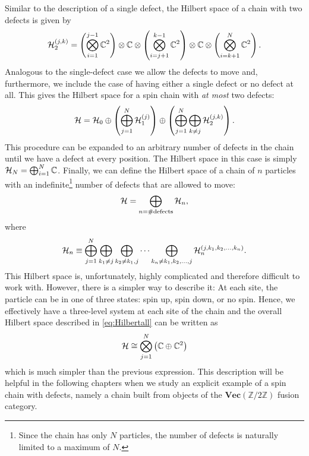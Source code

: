 Similar to the description of a single defect, the Hilbert space of a chain with two defects is given by
	\begin{equation}
		{\mathcal{H}}_2^{(j,k)}=\left(\bigotimes_{i=1}^{j-1}\mathbb{C}^2\right)\otimes\mathbb{C}\otimes\left(\bigotimes_{i=j+1}^{k-1}\mathbb{C}^2\right)\otimes\mathbb{C}\otimes\left(\bigotimes_{i=k+1}^{N}\mathbb{C}^2\right).
	\end{equation}
Analogous to the single-defect case we allow the defects to move and, furthermore, we include the case of having either a single defect or no defect at all. This gives the Hilbert space for a spin chain with \emph{at most} two defects:
	\begin{equation}
		{\mathcal{H}}={\mathcal{H}}_0\oplus\left(\bigoplus_{j=1}^N{\mathcal{H}}_1^{(j)}\right)\oplus\left(\bigoplus_{j=1}^N\bigoplus_{k\neq j}{\mathcal{H}}_2^{(j,k)}\right).
	\end{equation}
This procedure can be expanded to an arbitrary number of defects in the chain until we have a defect at every position. The Hilbert space in this case is simply ${\mathcal{H}}_N=\bigoplus_{i=1}^N\mathbb{C}$. Finally, we can define the Hilbert space of a chain of $n$ particles with an indefinite\footnote{Since the chain has only $N$ particles, the number of defects is naturally limited to a maximum of $N$.} number of defects that are allowed to move: 
	\begin{equation}
	\label{eq:Hilbertall}
		{\mathcal{H}}=\bigoplus_{n=\#\mathrm{ defects}}{\mathcal{H}}_n,
	\end{equation}
where 
	\begin{equation}
		{\mathcal{H}}_n\equiv\bigoplus_{j=1}^N\bigoplus_{k_1\neq j}\bigoplus_{k_2\neq k_1,j}\dots\bigoplus_{k_n\neq k_1,k_2,\dots,j}{\mathcal{H}}_n^{(j,k_1,k_2,\dots,k_n)}.
	\end{equation}
This Hilbert space is, unfortunately, highly complicated and therefore difficult to work with. However, there is a simpler way to describe it: At each site, the particle can be in one of three states: spin up, spin down, or no spin. Hence, we effectively have a three-level system at each site of the chain and the overall Hilbert space described in \cref{eq:Hilbertall} can be written as
	\begin{equation}
	\label{eq:totalHilb}
		{\mathcal{H}}\cong\bigotimes_{j=1}^N\left(\mathbb{C}\oplus\mathbb{C}^2\right)
	\end{equation}
which is much simpler than the previous expression. This description will be helpful in the following chapters when we study an explicit example of a spin chain with defects, namely a chain built from objects of the $\mathbf{Vec}(\mathbb{Z}/2\mathbb{Z})$ fusion category.


